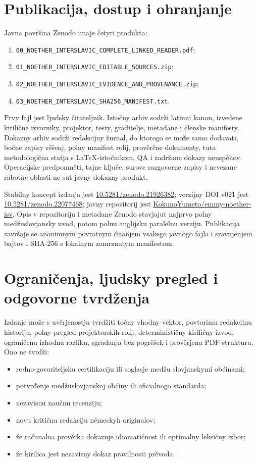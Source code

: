 \documentclass[11pt]{article}
\newcommand{\code}[1]{\texttt{#1}}
\newcommand{\doiurl}[1]{\href{https://doi.org/#1}{#1}}
\newcommand{\repo}{\href{https://github.com/KokunoYumeto/emmy-noether-isv}{KokunoYumeto/emmy-noether-isv}}
\begin{document}
\section{Publikacija, dostup i ohranjanje}

Javna površina Zenodo imaje četyri produkta:

\begin{enumerate}
\item \code{00\_NOETHER\_INTERSLAVIC\_COMPLETE\_LINKED\_READER.pdf};
\item \code{01\_NOETHER\_INTERSLAVIC\_EDITABLE\_SOURCES.zip};
\item \code{02\_NOETHER\_INTERSLAVIC\_EVIDENCE\_AND\_PROVENANCE.zip};
\item \code{03\_NOETHER\_INTERSLAVIC\_SHA256\_MANIFEST.txt}.
\end{enumerate}

Prvy fajl jest ljudsky čitateljnik. Iztočny arhiv sodrži latinni kanon, izvedene kirilične izvorniky, projektor, testy, graditelje, metadane i členske manifesty. Dokazny arhiv sodrži redakcijny žurnal, do ktorogo se može samo dodavati, bočne zapisy rěšenj, polny manifest rolij, prověrčne dokumenty, tuta metodologična statja s LaTeX-iztočnikom, QA i zadržane dokazy neuspěhov. Operacijske predpomněti, tajne ključe, surove razgovorne zapisy i nevezane rabotne oblasti ne sut javny dokazny produkt.

Stabilny koncept izdanja jest \doiurl{10.5281/zenodo.21926382}; verzijny DOI v021 jest \doiurl{10.5281/zenodo.22077468}; javny repozitorij jest \repo. Opis v repozitoriju i metadane Zenodo stavjajut najprvo polny medžuslovjansky uvod, potom polnu anglijsku paralelnu verziju. Publikacija završaje se anonimnym povratnym čitanjem vsakego javnogo fajla i sravnjenjem bajtov i SHA-256 s lokalnym zamrznutym manifestom.

\section{Ograničenja, ljudsky pregled i odgovorne tvrdženja}

Izdanje može s uvěrjenostju tvrdžiti točny vhodny vektor, povtorimu redakcijnu historiju, polny pregled projektorskih rolij, determinističny kiriličny izvod, ograničenu izhodnu razliku, sgrađanja bez pogrěšek i prověrjenu PDF-strukturu. Ono ne tvrdži:

\begin{itemize}
\item rodno-govoriteljsku certifikaciju ili soglasje medžu slovjanskymi obćinami;
\item potvrđenje medžuslovjanskoj obćiny ili oficialnogo standarda;
\item nezavisnu naučnu recenziju;
\item novu kritičnu redakciju německyh originalov;
\item že računalna prověrka dokazuje idiomatičnost ili optimalny leksičny izbor;
\item že kirilica jest nezavisny dokaz pravilnosti prěvoda.
\end{itemize}
\end{document}
